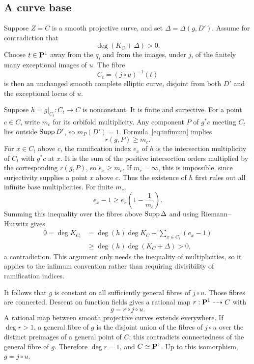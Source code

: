 \subsection{A curve base}
Suppose $Z=C$ is a smooth projective curve, and set
$\Delta=\Delta(g,D')$. Assume for contradiction that
\begin{equation}\label{eq:positive-base}
 \deg(K_C+\Delta)>0.
\end{equation}
Choose $t\in\mathbf P^1$ away from the $q_i$ and from the images, under $j$, of
the finitely many exceptional images of $u$. The fibre
\[
 C_t=(j\circ u)^{-1}(t)
\]
is then an unchanged smooth complete elliptic curve, disjoint from both
$D'$ and the exceptional locus of $u$.

Suppose $h=g|_{C_t}:C_t\to C$ is nonconstant. It is finite and
surjective. For a point $c\in C$, write $m_c$ for its orbifold
multiplicity. Any component $P$ of $g^*c$ meeting $C_t$ lies outside
$\operatorname{Supp} D'$, so $m_P(D')=1$. Formula~\eqref{eq:infimum} implies
\[
 r(g,P)\geq m_c.
\]
For $x\in C_t$ above $c$, the ramification index $e_x$ of $h$ is the
intersection multiplicity of $C_t$ with $g^*c$ at $x$. It is the sum of
the positive intersection orders multiplied by the corresponding
$r(g,P)$, so $e_x\geq m_c$. If $m_c=\infty$, this is impossible, since
surjectivity supplies a point $x$ above $c$. Thus the existence of $h$
first rules out all infinite base multiplicities. For finite $m_c$,
\[
 e_x-1\geq e_x\left(1-\frac1{m_c}\right).
\]
Summing this inequality over the fibres above $\operatorname{Supp}\Delta$ and using
Riemann--Hurwitz gives
\begin{align*}
 0=\deg K_{C_t}
 &=\deg(h)\deg K_C+\sum_{x\in C_t}(e_x-1)\\
 &\geq\deg(h)\deg(K_C+\Delta)>0,
\end{align*}
a contradiction. This argument only needs the inequality of
multiplicities, so it applies to the infimum convention rather than
requiring divisibility of ramification indices.

It follows that $g$ is constant on all sufficiently general fibres of
$j\circ u$. Those fibres are connected. Descent on function fields gives
a rational map $r:\mathbf P^1\dashrightarrow C$ with
\[
 g=r\circ j\circ u.
\]
A rational map between smooth projective curves extends everywhere. If
$\deg r>1$, a general fibre of $g$ is the disjoint union of the fibres of
$j\circ u$ over the distinct preimages of a general point of $C$; this
contradicts connectedness of the general fibre of $g$. Therefore
$\deg r=1$, and $C\simeq\mathbf P^1$. Up to this isomorphism, $g=j\circ u$.

